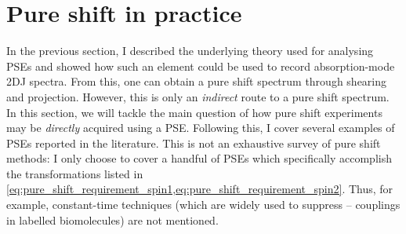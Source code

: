 \section{Pure shift in practice}
\label{sec:pureshift__intro_practice}

In the previous section, I described the underlying theory used for analysing PSEs and showed how such an element could be used to record absorption-mode 2DJ spectra.
From this, one can obtain a pure shift spectrum through shearing and projection.
However, this is only an \textit{indirect} route to a pure shift spectrum.
In this section, we will tackle the main question of how pure shift experiments may be \textit{directly} acquired using a PSE.
Following this, I cover several examples of PSEs reported in the literature.
This is not an exhaustive survey of pure shift methods: I only choose to cover a handful of PSEs which specifically accomplish the transformations listed in \cref{eq:pure_shift_requirement_spin1,eq:pure_shift_requirement_spin2}.
Thus, for example, constant-time techniques (which are widely used to suppress \carbon{}--\carbon{} couplings in labelled biomolecules) are not mentioned.




